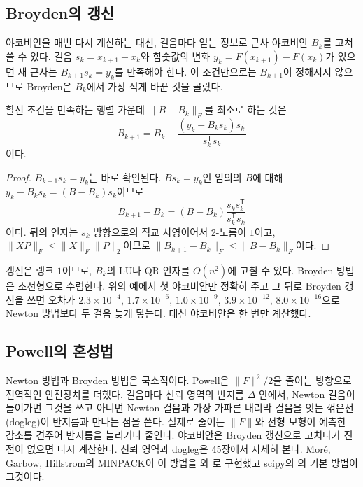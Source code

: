 \subsection{Broyden의 갱신}

야코비안을 매번 다시 계산하는 대신, 걸음마다 얻는 정보로 근사 야코비안 $B_k$를 고쳐 쓸 수 있다. 걸음 $s_k=x_{k+1}-x_k$와 함숫값의 변화 $y_k=F(x_{k+1})-F(x_k)$가 있으면 새 근사는  $B_{k+1}s_k=y_k$를 만족해야 한다. 이 조건만으로는 $B_{k+1}$이 정해지지 않으므로 Broyden은 $B_k$에서 가장 적게 바꾼 것을 골랐다\cite{broyden1965}.

\begin{proposition}
\label{prop:broyden}
할선 조건을 만족하는 행렬 가운데 $\|B-B_k\|_F$를 최소로 하는 것은
\[
B_{k+1}=B_k+\frac{(y_k-B_ks_k)s_k^{\mathsf T}}{s_k^{\mathsf T}s_k}
\]
이다.
\end{proposition}

\begin{proof}
$B_{k+1}s_k=y_k$는 바로 확인된다. $Bs_k=y_k$인 임의의 $B$에 대해 $y_k-B_ks_k=(B-B_k)s_k$이므로
\[
B_{k+1}-B_k=(B-B_k)\frac{s_ks_k^{\mathsf T}}{s_k^{\mathsf T}s_k}
\]
이다. 뒤의 인자는 $s_k$ 방향으로의 직교 사영이어서 2-노름이 $1$이고, $\|XP\|_F\le\|X\|_F\|P\|_2$이므로 $\|B_{k+1}-B_k\|_F\le\|B-B_k\|_F$이다.
\end{proof}

갱신은 랭크 $1$이므로, $B_k$의 LU나 QR 인자를 $O(n^2)$에 고칠 수 있다. Broyden 방법은 초선형으로 수렴한다\cite{dennis1977quasi}. 위의 예에서 첫 야코비안만 정확히 주고 그 뒤로 Broyden 갱신을 쓰면 오차가 $2.3\times10^{-4}$, $1.7\times10^{-6}$, $1.0\times10^{-9}$, $3.9\times10^{-12}$, $8.0\times10^{-16}$으로 Newton 방법보다 두 걸음 늦게 닿는다. 대신 야코비안은 한 번만 계산했다.

\subsection{Powell의 혼성법}

Newton 방법과 Broyden 방법은 국소적이다. Powell은 $\|F\|^2/2$을 줄이는 방향으로 전역적인 안전장치를 더했다\cite{powell1970hybrid}. 걸음마다 신뢰 영역의 반지름 $\Delta$ 안에서, Newton 걸음이 들어가면 그것을 쓰고 아니면 Newton 걸음과 가장 가파른 내리막 걸음을 잇는 꺾은선(dogleg)이 반지름과 만나는 점을 쓴다. 실제로 줄어든 $\|F\|$와 선형 모형이 예측한 감소를 견주어 반지름을 늘리거나 줄인다. 야코비안은 Broyden 갱신으로 고치다가 진전이 없으면 다시 계산한다. 신뢰 영역과 dogleg은 45장에서 자세히 본다. Moré, Garbow, Hillstrom의 MINPACK이 이 방법을 와 로 구현했고\cite{more1980minpack} scipy의 의 기본 방법이 그것이다.

